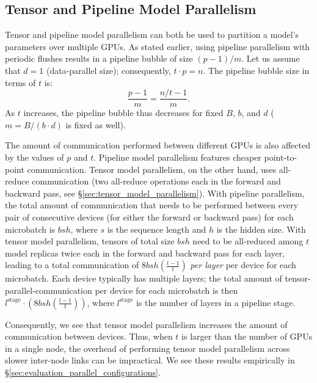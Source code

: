 \subsection{Tensor and Pipeline Model Parallelism} Tensor and pipeline model parallelism can both be used to partition a model's parameters over multiple GPUs. As stated earlier, using pipeline parallelism with periodic flushes results in a pipeline bubble of size $(p-1) / m$. Let us assume that $d=1$ (data-parallel size); consequently, $t \cdot p = n$. The pipeline bubble size in terms of $t$ is:
$$\frac{p-1}{m} = \frac{n/t-1}{m}.$$
As $t$ increases, the pipeline bubble thus decreases for fixed $B$, $b$, and $d$ ($m = B / (b \cdot d)$ is fixed as well).

The amount of communication performed between different GPUs is also affected by the values of $p$ and $t$. Pipeline model parallelism features cheaper point-to-point communication. Tensor model parallelism, on the other hand, uses all-reduce communication (two all-reduce operations each in the forward and backward pass, see \S\ref{sec:tensor_model_parallelism}). With pipeline parallelism, the total amount of communication that needs to be performed between every pair of consecutive devices (for either the forward or backward pass) for each microbatch is $bsh$, where $s$ is the sequence length and $h$ is the hidden size. With tensor model parallelism, tensors of total size $bsh$ need to be all-reduced among $t$ model replicas twice each in the forward and backward pass for each layer, leading to a total communication of $8bsh \left(\frac{t-1}{t}\right)$ \emph{per layer} per device for each microbatch. Each device typically has multiple layers; the total amount of tensor-parallel-communication per device for each microbatch is then $l^{\text{stage}} \cdot \left(8bsh \left(\frac{t-1}{t}\right)\right)$, where $l^{\text{stage}}$ is the number of layers in a pipeline stage.

Consequently, we see that tensor model parallelism increases the amount of communication between devices. Thus, when $t$ is larger than the number of GPUs in a single node, the overhead of performing tensor model parallelism across slower inter-node links can be impractical. We see these results empirically in \S\ref{sec:evaluation_parallel_configurations}.


